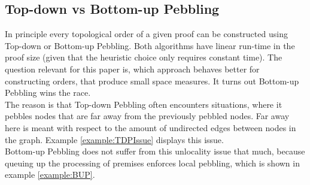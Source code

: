 \documentclass{llncs}
\begin{document}
\subsection{Top-down vs Bottom-up Pebbling} %

\label{sec:TDvsBU}

In principle every topological order of a given proof can be constructed using Top-down or Bottom-up Pebbling.
Both algorithms have linear run-time in the proof size (given that the heuristic choice only requires constant time). 
The question relevant for this paper is, which approach behaves better for constructing orders, that produce small space measures.
It turns out Bottom-up Pebbling wins the race.\\
The reason is that Top-down Pebbling often encounters situations, where it pebbles nodes that are far away from the previously pebbled nodes.
Far away here is meant with respect to the amount of undirected edges between nodes in the graph. Example \ref{example:TDPIssue} displays this issue.\\
Bottom-up Pebbling does not suffer from this unlocality issue that much, because queuing up the processing of premises enforces local pebbling, which is shown in example \ref{example:BUP}.
\end{document}
